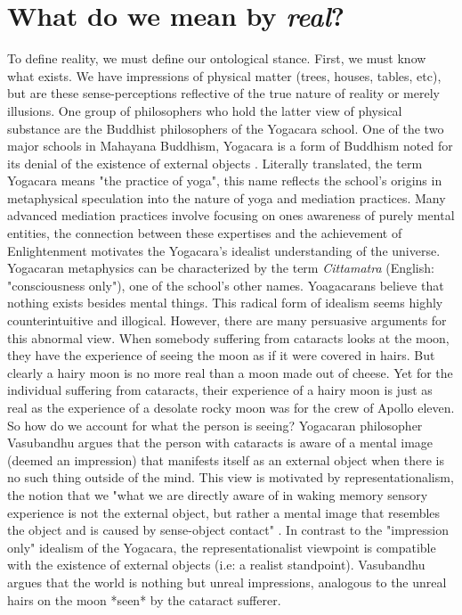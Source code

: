 \section{What do we mean by \textit{real}?}
To define reality, we must define our ontological stance. First, we must know what exists. We have impressions of physical matter (trees, houses, tables, etc), but are these sense-perceptions reflective of the true nature of reality or merely illusions. One group of philosophers who hold the latter view of physical substance are the Buddhist philosophers of the Yogacara school.  
\newline 
One of the two major schools in Mahayana Buddhism, Yogacara is a form of Buddhism noted for its denial of the existence of external objects \cite{siderits2007buddhism} . Literally translated, the term Yogacara means "the practice of yoga", this name reflects the school's origins in metaphysical speculation into the nature of yoga and mediation practices. Many advanced mediation practices involve focusing on ones awareness of purely mental entities, the connection between these expertises and the achievement of Enlightenment motivates the Yogacara's idealist understanding of the universe. Yogacaran metaphysics can be characterized by the term \textit{Cittamatra} (English: "consciousness only"), one of the school's other names. Yoagacarans believe that nothing exists besides mental things. This radical form of idealism seems highly counterintuitive and illogical. However, there are many persuasive arguments for this abnormal view. When somebody suffering from cataracts looks at the moon, they have the experience of seeing the moon as if it were covered in hairs. But clearly a hairy moon is no more real than a moon made out of cheese. Yet for the individual suffering from cataracts, their experience of a hairy moon is just as real as the experience of a desolate rocky moon was for the crew of Apollo eleven. So how do we account for what the person is seeing? Yogacaran philosopher Vasubandhu argues that the person with cataracts is aware of a mental image (deemed an impression) that manifests itself as an external object when there is no such thing outside of the mind. This view is motivated by representationalism, the notion that we "what we are directly aware of in waking memory sensory experience is not the external object, but rather a mental image that resembles the object and is caused by sense-object contact" \cite{siderits2007buddhism}.  \newline In contrast to the "impression only" idealism of the Yogacara, the representationalist viewpoint is compatible with the existence of external objects (i.e: a realist standpoint). Vasubandhu argues that the world is nothing but unreal impressions, analogous to the unreal hairs on the moon *seen* by the cataract sufferer.
\newline

